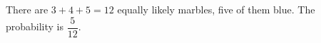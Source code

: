 There are $3+4+5=12$ equally likely marbles, five of them blue. The probability is $\boxed{\dfrac{5}{12}}$.
